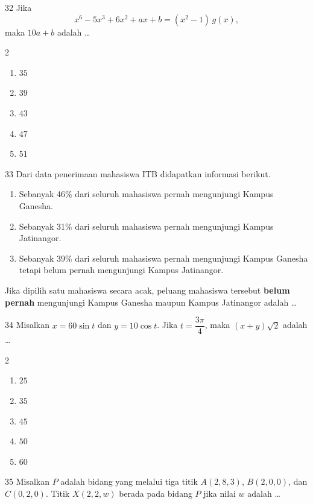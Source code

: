 \documentclass[11pt]{article}
\newenvironment{pilB}{%
  \par\smallskip\begin{multicols}{2}
  \begin{enumerate}[label=(\Alph*),leftmargin=*,itemsep=1pt,topsep=3pt]}%
  {\end{enumerate}\end{multicols}}
\begin{document}
\begin{soal}{32}
Jika
\[
  x^6-5x^3+6x^2+ax+b=(x^2-1)\,g(x),
\]
maka $10a+b$ adalah \ldots
\begin{pilB}
  \item $35$ \item $39$ \item $43$ \item $47$ \item $51$
\end{pilB}
\end{soal}

\begin{soal}{33}
Dari data penerimaan mahasiswa ITB didapatkan informasi berikut.
\begin{enumerate}[leftmargin=*,itemsep=2pt,topsep=3pt]
  \item Sebanyak 46\% dari seluruh mahasiswa pernah mengunjungi
        Kampus Ganesha.
  \item Sebanyak 31\% dari seluruh mahasiswa pernah mengunjungi
        Kampus Jatinangor.
  \item Sebanyak 39\% dari seluruh mahasiswa pernah mengunjungi
        Kampus Ganesha tetapi belum pernah mengunjungi Kampus
        Jatinangor.
\end{enumerate}
Jika dipilih satu mahasiswa secara acak, peluang mahasiswa tersebut
\textbf{belum pernah} mengunjungi Kampus Ganesha maupun Kampus
Jatinangor adalah \ldots
\end{soal}

\begin{soal}{34}
Misalkan $x=60\sin t$ dan $y=10\cos t$. Jika $t=\dfrac{3\pi}{4}$,
maka $(x+y)\sqrt{2}$ adalah \ldots
\begin{pilB}
  \item $25$ \item $35$ \item $45$ \item $50$ \item $60$
\end{pilB}
\end{soal}

\begin{soal}{35}
Misalkan $P$ adalah bidang yang melalui tiga titik $A(2,8,3)$,
$B(2,0,0)$, dan $C(0,2,0)$. Titik $X(2,2,w)$ berada pada bidang
$P$ jika nilai $w$ adalah \ldots
\end{soal}
\end{document}
